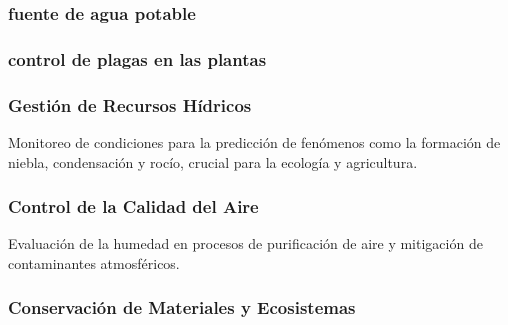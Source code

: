         \subsubsection{fuente de agua potable}
        \subsubsection{control de plagas en las plantas}
        \subsubsection{Gestión de Recursos Hídricos}
        Monitoreo de condiciones para la predicción de fenómenos como la formación de niebla, condensación y rocío, crucial para la ecología y agricultura.
        \subsubsection{Control de la Calidad del Aire}
        Evaluación de la humedad en procesos de purificación de aire y mitigación de contaminantes atmosféricos.

        \subsubsection{Conservación de Materiales y Ecosistemas}